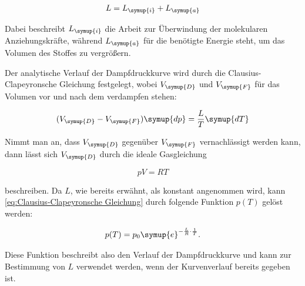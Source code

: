 \begin{equation}
    L=L_{\symup{i}}+L_{\symup{a}}
    \label{eq:Verdampfungswärme}
\end{equation}

Dabei beschreibt $L_{\symup{i}}$ die Arbeit zur Überwindung der molekularen Anziehungskräfte, während $L_{\symup{a}}$
für die benötigte Energie steht, um das Volumen des Stoffes zu vergrößern.

Der analytische Verlauf der Dampfdruckkurve wird durch die Clausius-Clapeyronsche Gleichung festgelegt, wobei
$V_{\symup{D}}$ und $V_{\symup{F}}$ für das Volumen vor und nach dem verdampfen stehen:

\begin{equation}
    (V_{\symup{D}}-V_{\symup{F}})\symup{dp}=\frac{L}{T}\symup{dT}
    \label{eq:Clausius-Clapeyronsche Gleichung}
\end{equation}

Nimmt man an, dass $V_{\symup{D}}$ gegenüber $V_{\symup{F}}$ vernachlässigt werden kann, dann
lässt sich $V_{\symup{D}}$ durch die ideale Gasgleichung 

\begin{equation}
    pV=RT
    \label{eq:Ideale Gasgleichung}
\end{equation}

beschreiben. Da $L$, wie bereits erwähnt, als konstant angenommen wird, kann \eqref{eq:Clausius-Clapeyronsche Gleichung}
durch folgende Funktion $p(T)$ gelöst werden:

\begin{equation}
    p(T)=p_0\symup{e}^{-\frac{L}{R}\cdot\frac{1}{T}}.
    \label{eq:Druck}
\end{equation}

Diese Funktion beschreibt also den Verlauf der Dampfdruckkurve und kann zur Bestimmung von $L$ verwendet werden, wenn
der Kurvenverlauf bereits gegeben ist.